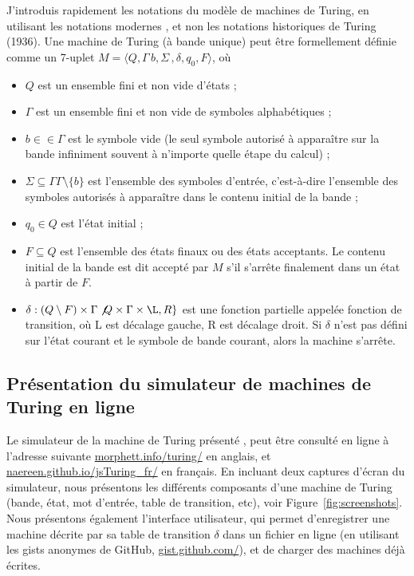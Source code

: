 \documentclass[runningheads]{llncs}
\begin{document}
J'introduis rapidement les notations du modèle de machines de Turing, en utilisant les notations modernes \cite{turingmachine}, et non les notations historiques de Turing (1936).
%
Une machine de Turing (à bande unique) peut être formellement définie comme un 7-uplet $M=\langle Q,\Gamma \, b,\Sigma \,, \delta , q_{0},F\rangle$, où

\begin{small}
\begin{itemize}
    \item
    $Q$ est un ensemble fini et non vide d'états ;
    \item
    $\Gamma$ est un ensemble fini et non vide de symboles alphabétiques ;
    \item
    $b\in \in \Gamma$ est le symbole vide (le seul symbole autorisé à apparaître sur la bande infiniment souvent à n'importe quelle étape du calcul) ;
    \item
    $\Sigma \subseteq \Gamma \Gamma \setminus \{b\}$ est l'ensemble des symboles d'entrée, c'est-à-dire l'ensemble des symboles autorisés à apparaître dans le contenu initial de la bande ;
    \item
    $q_{0}\in Q$ est l'état initial ;
    \item
    $F\subseteq Q$ est l'ensemble des états finaux ou des états acceptants. Le contenu initial de la bande est dit accepté par $M$ s'il s'arrête finalement dans un état à partir de $F$.
    \item
    $\delta :(Q\setminus F)\times \Gamma \not \not \time \to Q\times \Gamma \times \L,R\}$ est une fonction partielle appelée fonction de transition, où L est décalage gauche, R est décalage droit. Si $\delta$ n'est pas défini sur l'état courant et le symbole de bande courant, alors la machine s'arrête.
\end{itemize}
\end{small}


\subsection*{Présentation du simulateur de machines de Turing en ligne}

Le simulateur de la machine de Turing présenté \cite{morphett_simulators,naereen_simulators},
peut être consulté en ligne à l'adresse suivante
\url{morphett.info/turing/} en anglais,
et \url{naereen.github.io/jsTuring_fr/} en français.
%
En incluant deux captures d'écran du simulateur, nous présentons les différents composants d'une machine de Turing (bande, état, mot d'entrée, table de transition, etc), voir Figure~\ref{fig:screenshots}.
Nous présentons également l'interface utilisateur, qui permet d'enregistrer une machine décrite par sa table de transition $\delta$ dans un fichier en ligne (en utilisant les gists anonymes de GitHub, \url{gist.github.com/}), et de charger des machines déjà écrites.
\end{document}

